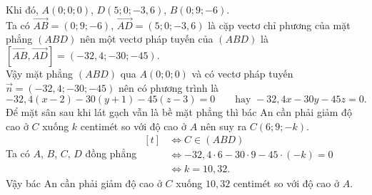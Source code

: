 \begin{ex}
{Khi đó, $A(0 ; 0 ; 0)$, $D(5; 0 ; -3{,}6)$, $B(0; 9 ; -6)$.\\
Ta có $\overrightarrow{AB}=(0 ; 9 ; -6)$, $ \overrightarrow{AD}=(5 ; 0 ; -3{,}6)$ là cặp vectơ chỉ phương của mặt phẳng $(ABD)$ nên một vectơ pháp tuyến của $(ABD)$ là $\left[\overrightarrow{AB}, \overrightarrow{AD}\right]=(-32{,}4 ; -30 ; -45)$.\\
Vậy mặt phẳng $(ABD)$ qua $A(0 ; 0 ; 0)$ và có vectơ pháp tuyến $\vec{n}=(-32{,}4 ; -30 ; -45)$ nên có phương trình là
\[-32{,}4 (x-2)-30(y+1)-45(z-3)=0 \qquad \text{hay } -32{,}4 x -30y -45z=0.\]
Để mặt sân sau khi lát gạch vẫn là bề mặt phẳng thì bác An cần phải giảm độ cao ở $C$ xuống $k$ centimét so với độ cao ở $A$ nên suy ra $C(6; 9 ; -k)$.\\
Ta có $A$, $B$, $C$, $D$ đồng phẳng	$\begin{aligned}[t]
&\Leftrightarrow C \in (ABD)\\
&\Leftrightarrow -32{,}4\cdot 6 -30 \cdot 9 -45\cdot (-k)=0\\
&\Leftrightarrow k=10{,}32.
\end{aligned}$\\
Vậy bác An cần phải giảm độ cao ở $C$ xuống $10{,}32$ centimét so với độ cao ở $A$.
}
\end{ex}



